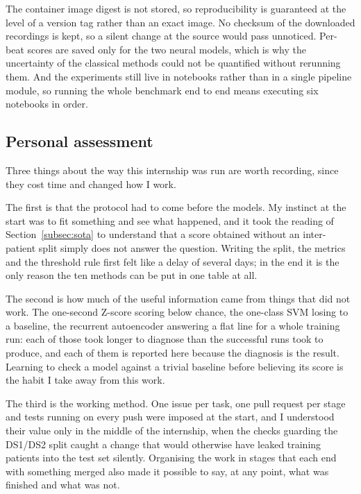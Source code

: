\documentclass[a4paper, 12pt]{article}
\begin{document}
The container image digest is not stored, so reproducibility is guaranteed at the
level of a version tag rather than an exact image. No checksum of the downloaded
recordings is kept, so a silent change at the source would pass unnoticed. Per-beat
scores are saved only for the two neural models, which is why the uncertainty of
the classical methods could not be quantified without rerunning them. And the
experiments still live in notebooks rather than in a single pipeline module, so
running the whole benchmark end to end means executing six notebooks in order.

\subsection{Personal assessment} \label{subsec:personal}

Three things about the way this internship was run are worth recording, since
they cost time and changed how I work.

The first is that the protocol had to come before the models. My instinct at the
start was to fit something and see what happened, and it took the reading of
Section~\ref{subsec:sota} to understand that a score obtained without an
inter-patient split simply does not answer the question. Writing the split, the
metrics and the threshold rule first felt like a delay of several days; in the end
it is the only reason the ten methods can be put in one table at all.

The second is how much of the useful information came from things that did not
work. The one-second Z-score scoring below chance, the one-class SVM losing to a
baseline, the recurrent autoencoder answering a flat line for a whole training
run: each of those took longer to diagnose than the successful runs took to
produce, and each of them is reported here because the diagnosis is the result.
Learning to check a model against a trivial baseline before believing its score
is the habit I take away from this work.

The third is the working method. One issue per task, one pull request per stage
and tests running on every push were imposed at the start, and I understood their
value only in the middle of the internship, when the checks guarding the DS1/DS2
split caught a change that would otherwise have leaked training patients into the
test set silently. Organising the work in stages that each end with something
merged also made it possible to say, at any point, what was finished and what was
not.
\end{document}
